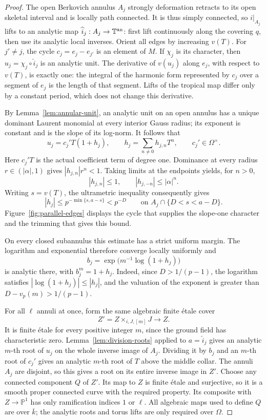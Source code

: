 \begin{proof}
The open Berkovich annulus $A_j$ strongly deformation retracts to its
open skeletal interval \cite[Section~2.3]{BakerPayneRabinoff}
and is locally path connected. It is thus
simply connected, so $i|_{A_j}$ lifts to an analytic map
$\widehat i_j:A_j\to\mathbb T^{\rm an}$: first lift continuously along
the covering $q$, then use its analytic local inverses. Orient all
edges by increasing $v(T)$. For $j'\ne j$, the cycle
$c_j=e_j-e_{j'}$ is an element of $M$. If $\chi_j$ is its character,
then $u_j=\chi_j\circ\widehat i_j$ is an analytic unit. The derivative
of $v(u_j)$ along $e_j$, with respect to $v(T)$, is exactly one: the
integral of the harmonic form represented by $c_j$ over a segment of
$e_j$ is the length of that segment. Lifts of the tropical map differ
only by a constant period, which does not change this derivative.

By Lemma~\ref{lem:annular-unit}, an analytic unit on an open annulus
has a unique dominant Laurent monomial at every interior Gauss
radius; its exponent is constant and is the slope of its log-norm. It follows that
\[
 u_j=c_j' T(1+h_j),\qquad
 h_j=\sum_{n\ne0}h_{j,n}T^n,
 \qquad c_j'\in\Omega^\times.
\]
Here $c_j'T$ is the actual coefficient term of degree one.
Dominance at every radius $r\in(|\alpha|,1)$ gives
$|h_{j,n}|r^n<1$. Taking limits at the endpoints yields, for $n>0$,
\[
 |h_{j,n}|\le1,\qquad |h_{j,-n}|\le|\alpha|^n.
\]
Writing $s=v(T)$, the ultrametric inequality consequently gives
\[
 |h_j|\le p^{-\min\{s,a-s\}}<p^{-D}
 \qquad\text{on }A_j\cap\{D<s<a-D\}.
\]
Figure~\ref{fig:parallel-edges} displays the cycle that supplies the
slope-one character and the trimming that gives this bound.



On every closed subannulus this estimate has a
strict uniform margin. The logarithm and exponential therefore
converge locally uniformly and
\[
 b_j=\exp\bigl(m^{-1}\log(1+h_j)\bigr)
\]
is analytic there, with $b_j^m=1+h_j$. Indeed, since
$D>1/(p-1)$, the logarithm satisfies
$|\log(1+h_j)|\le |h_j|$, and the valuation of the exponent is
greater than $D-v_p(m)>1/(p-1)$.

For all $\ell$ annuli at once, form the same algebraic finite \'etale cover
\[
 Z'=Z\times_{i,J,[m]}J\longrightarrow Z.
\]
It is finite \'etale for every positive integer $m$, since the ground
field has characteristic zero. Lemma~\ref{lem:division-roots} applied
to $a=\widehat i_j$ gives an analytic $m$-th root of $u_j$ on the
whole inverse image of $A_j$. Dividing it by $b_j$ and an $m$-th root
of $c_j'$ gives an analytic $m$-th root of $T$ above the middle
collar. The annuli $A_j$ are disjoint, so this gives a root on its
entire inverse image in $Z'$. Choose any connected component $Q$ of
$Z'$. Its map to $Z$ is finite \'etale and surjective, so it is a smooth
proper connected curve with the required property. Its composite
with $Z\to\mathbb P^1$ has only ramification indices $1$ or $\ell$.
All algebraic maps used to define $Q$ are over $\overline{k}$; the
analytic roots and torus lifts are only required over $\Omega$.
\end{proof}
